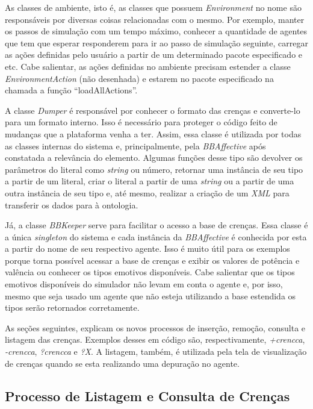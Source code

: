 As classes de ambiente, isto é, as classes que possuem \emph{Environment} no
nome são responsáveis por diversas coisas relacionadas com o mesmo. Por
exemplo, manter os passos de simulação com um tempo máximo, conhecer a
quantidade de agentes que tem que esperar responderem para ir ao passo de
simulação seguinte, carregar as ações definidas pelo usuário a partir de um
determinado pacote especificado e etc. Cabe salientar, as ações definidas no
ambiente precisam estender a classe \emph{EnvironmentAction} (não desenhada) e
estarem no pacote especificado na chamada a função ``loadAllActions''.

A classe \emph{Dumper} é responsável por conhecer o formato das crenças \jason
e converte-lo para um formato interno. Isso é necessário para proteger o
código feito de mudanças que a plataforma venha a ter. Assim, essa classe é
utilizada por todas as classes internas do sistema e, principalmente, pela
\emph{BBAffective} após constatada a relevância do elemento. Algumas funções
desse tipo são devolver os parâmetros do literal como \emph{string} ou número,
retornar uma instância de seu tipo a partir de um literal, criar o literal a
partir de uma \emph{string} ou a partir de uma outra instância de seu tipo e,
até mesmo, realizar a criação de um \emph{XML} para transferir os dados para
à ontologia.

Já, a classe \emph{BBKeeper} serve para facilitar o acesso a base de crenças.
Essa classe é a única \emph{singleton} do sistema e cada instância da
\emph{BBAffective} é conhecida por esta a partir do nome de seu respectivo
agente. Isso é muito útil para os exemplos porque torna possível acessar a
base de crenças e exibir os valores de potência e valência ou conhecer os
tipos emotivos disponíveis. Cabe salientar que os tipos emotivos disponíveis
do simulador não levam em conta o agente e, por isso, mesmo que seja usado um
agente que não esteja utilizando a base estendida os tipos serão retornados
corretamente.

As seções seguintes, explicam os novos processos de inserção, remoção,
consulta e listagem das crenças. Exemplos desses em código \jason são,
respectivamente, \emph{+crencca}, \emph{-crencca}, \emph{?crencca} e
\emph{?X}. A listagem, também, é utilizada pela tela de visualização de
crenças quando se esta realizando uma depuração no agente.

\subsection{Processo de Listagem e Consulta de Crenças}

